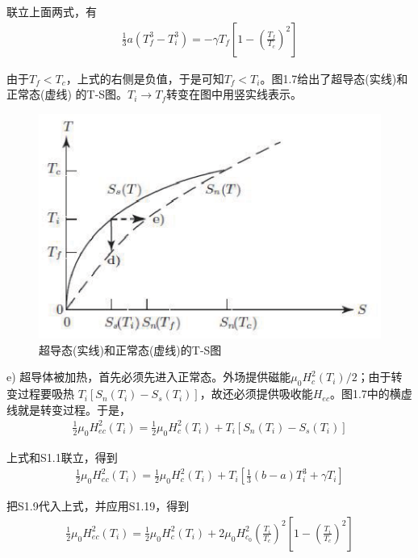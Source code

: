 联立上面两式，有
\begin{align*}
\frac{1}{3}a(T_f^3-T_i^3)=-\gamma T_f\left[ 1-\left(\frac{T_f}{T_c}\right)^2\right]\tag{S1.20}
\end{align*}

由于$T_f<T_c$，上式的右侧是负值，于是可知$T_f<T_i$。图1.7给出了超导态(实线)和正常态(虚线)
的T-S图。$T_i\rightarrow T_f$转变在图中用竖实线表示。

\begin{figure}
  \centering
 \includegraphics[scale=0.7]{chpt1/figs/fig1.7.eps}
  \caption{超导态(实线)和正常态(虚线)的T-S图}\label{fig:tsplot}
\end{figure}

e) 超导体被加热，首先必须先进入正常态。外场提供磁能$\mu_0 H_c^2(T_i)/2$；由于转变过程要吸热
$T_i[S_n(T_i)-S_s(T_i)]$，故还必须提供吸收能$H_{ec}$。图1.7中的横虚线就是转变过程。于是，
\begin{align*}
\frac{1}{2}\mu_0 H_{ec}^2(T_i)=\frac{1}{2}\mu_0 H_c^2(T_i)+T_i[S_n(T_i)-S_s(T_i)]\tag{S1.21}
\end{align*}

上式和S1.1联立，得到
\begin{align*}
\frac{1}{2}\mu_0 H_{ec}^2(T_i)=\frac{1}{2}\mu_0 H_c^2(T_i)+T_i\left[\frac{1}{3}(b-a)T_i^3+\gamma T_i\right] \tag{S1.22}
\end{align*}

把S1.9代入上式，并应用S1.19，得到
\begin{align*}
\frac{1}{2}\mu_0 H_{ec}^2(T_i)=\frac{1}{2}\mu_0 H_c^2(T_i)+2\mu_0 H_{c_0}^2\left(\frac{T_i}{T_c}\right)^2 \left[1-\left(\frac{T_i}{T_c}\right)^2 \right] \tag{S1.23}
\end{align*}

